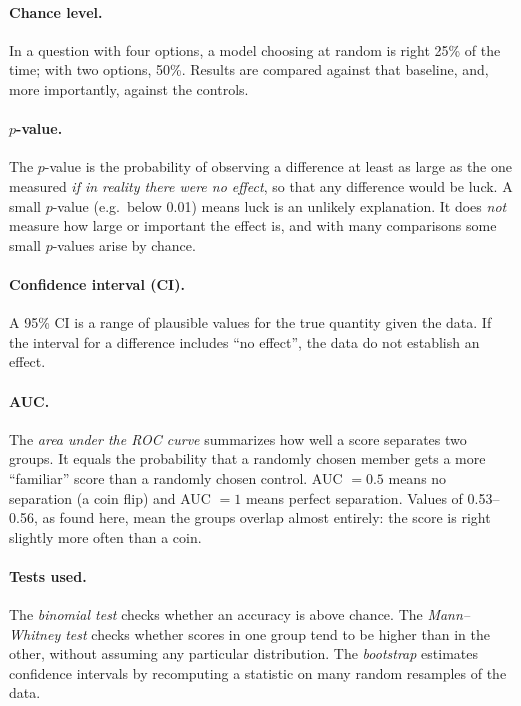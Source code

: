 \documentclass[10pt,a4paper]{article}
\begin{document}
\paragraph{Chance level.} In a question with four options, a model choosing at random is right 25\% of the time; with
two options, 50\%. Results are compared against that baseline, and, more importantly, against the controls.

\paragraph{$p$-value.} The $p$-value is the probability of observing a difference at least as large as the one
measured \emph{if in reality there were no effect}, so that any difference would be luck. A small $p$-value (e.g.\
below 0.01) means luck is an unlikely explanation. It does \emph{not} measure how large or important the effect is,
and with many comparisons some small $p$-values arise by chance.

\paragraph{Confidence interval (CI).} A 95\% CI is a range of plausible values for the true quantity given the data.
If the interval for a difference includes ``no effect'', the data do not establish an effect.

\paragraph{AUC.} The \emph{area under the ROC curve} summarizes how well a score separates two groups. It equals the
probability that a randomly chosen member gets a more ``familiar'' score than a randomly chosen control. AUC $=0.5$
means no separation (a coin flip) and AUC $=1$ means perfect separation. Values of 0.53--0.56, as found here, mean
the groups overlap almost entirely: the score is right slightly more often than a coin.

\paragraph{Tests used.} The \emph{binomial test} checks whether an accuracy is above chance. The
\emph{Mann--Whitney test} checks whether scores in one group tend to be higher than in the other, without assuming any
particular distribution. The \emph{bootstrap} estimates confidence intervals by recomputing a statistic on many
random resamples of the data.
\end{document}
